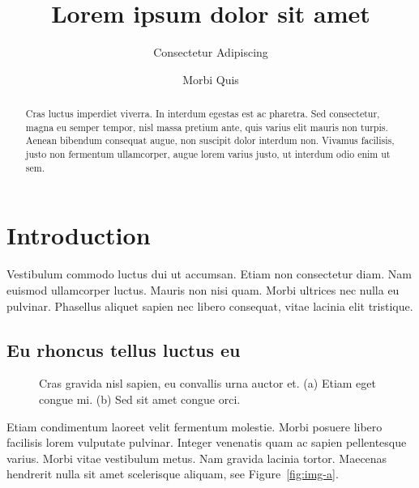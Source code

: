 \documentclass[
    a4paper,
    twocolumn,
    aps, pra,
    superscriptaddress,
    amsmath,amssymb
]{revtex4-2}
\theoremstyle{definition}
\begin{document}
\title{Lorem ipsum dolor sit amet}

\author{Consectetur Adipiscing}

\author{Morbi Quis}

\begin{abstract}
    Cras luctus imperdiet viverra. In interdum egestas est ac pharetra. Sed consectetur, magna eu
    semper tempor, nisl massa pretium ante, quis varius elit mauris non turpis. Aenean bibendum
    consequat augue, non suscipit dolor interdum non. Vivamus facilisis, justo non fermentum
    ullamcorper, augue lorem varius justo, ut interdum odio enim ut sem.
\end{abstract}

\maketitle

\section{Introduction}

Vestibulum commodo luctus dui ut accumsan. Etiam non consectetur diam. Nam euismod ullamcorper
luctus. Mauris non nisi quam. Morbi ultrices nec nulla eu pulvinar. Phasellus aliquet sapien nec
libero consequat, vitae lacinia elit tristique.

\subsection{Eu rhoncus tellus luctus eu}

\begin{figure}
    \hfill{}\hfill
    \hfill\kern 0pt\relax
    \caption{Cras gravida nisl sapien, eu convallis urna auctor et. (a) Etiam eget congue mi.
    (b) Sed sit amet congue orci.}\label{fig:img-letters}
\end{figure}

Etiam condimentum laoreet velit fermentum molestie. Morbi posuere libero
facilisis lorem vulputate pulvinar. Integer venenatis quam ac sapien pellentesque varius. Morbi
vitae vestibulum metus. Nam gravida lacinia tortor. Maecenas hendrerit nulla sit amet
scelerisque aliquam, see Figure~\ref{fig:img-a}.
\end{document}
